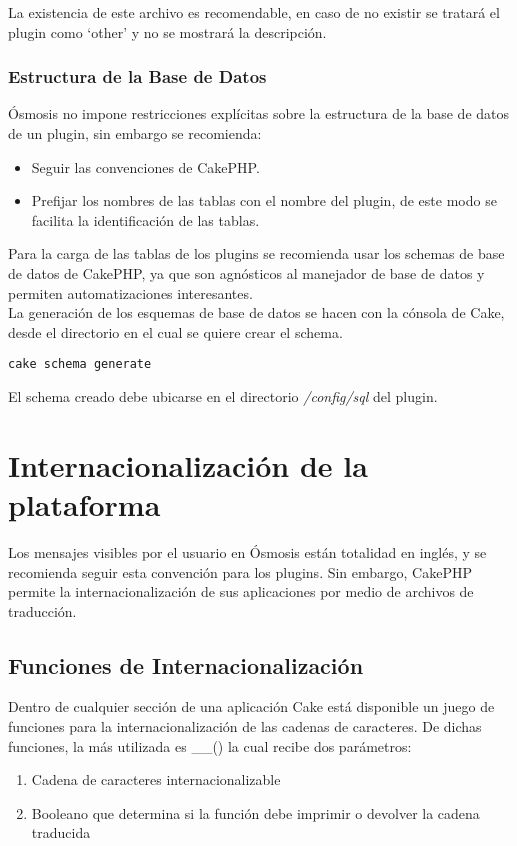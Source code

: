 La existencia de este archivo es recomendable, en caso de no existir se tratará el plugin como `other' y no se mostrará la descripción.

\subsubsection{Estructura de la Base de Datos}
Ósmosis no impone restricciones explícitas sobre la estructura de la base de datos de un plugin, sin embargo se recomienda:
\begin{itemize}
	\item Seguir las convenciones de CakePHP.
	\item Prefijar los nombres de las tablas con el nombre del plugin, de este modo se facilita la identificación de las tablas.
\end{itemize}

Para la carga de las tablas de los plugins se recomienda usar los schemas de base de datos de CakePHP, ya que son agnósticos al manejador de base de datos y permiten automatizaciones interesantes.\\

La generación de los esquemas de base de datos se hacen con la cónsola de Cake, desde el directorio en el cual se quiere crear el schema.

\begin{lstlisting}
cake schema generate
\end{lstlisting}

El schema creado debe ubicarse en el directorio \emph{/config/sql} del plugin.

\section[Internacionalización]{Internacionalización de la plataforma}
Los mensajes visibles por el usuario en Ósmosis están totalidad en inglés, y se recomienda seguir esta convención para los plugins. Sin embargo, CakePHP permite la internacionalización de sus aplicaciones por medio de archivos de traducción.

\subsection{Funciones de Internacionalización}
Dentro de cualquier sección de una aplicación Cake está disponible un juego de funciones para la internacionalización de las cadenas de caracteres. De dichas funciones, la más utilizada es \_\_() la cual recibe dos parámetros:
\begin{enumerate}
	\item Cadena de caracteres internacionalizable
	\item Booleano que determina si la función debe imprimir o devolver la cadena traducida
\end{enumerate}

